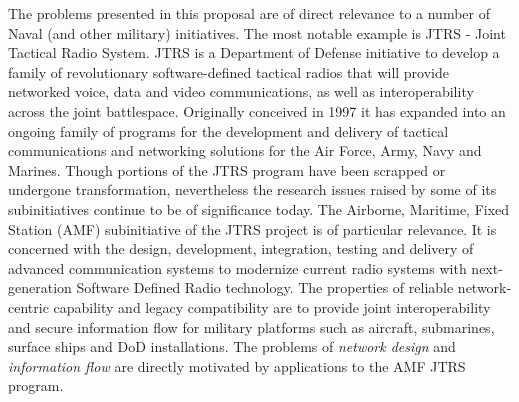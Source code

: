 The problems presented in this proposal are of direct relevance to a number of Naval (and other military) 
initiatives. The most notable example is JTRS \cite{feickert} - Joint Tactical Radio System. 
JTRS is a Department of 
Defense initiative to develop a family of revolutionary software-defined tactical radios 
that will provide networked voice, data and video communications, as well as interoperability 
across the joint battlespace. Originally conceived in 1997 it has expanded into an ongoing 
family of programs for the development and delivery of tactical communications and networking 
solutions for the Air Force, Army, Navy and Marines. Though portions of the JTRS program have
been scrapped or undergone transformation, nevertheless the research issues raised by some of 
its subinitiatives continue to be of significance today.
The Airborne, Maritime, Fixed Station (AMF) subinitiative of the JTRS project is of particular 
relevance.  It is concerned with the design, development, integration, testing and delivery of
advanced communication systems to modernize current radio systems with next-generation 
Software Defined Radio technology. The properties of reliable network-centric capability and legacy 
compatibility are to provide joint interoperability and secure information flow for 
military platforms such as aircraft, submarines, surface ships and DoD installations.
The problems of {\em network design} and {\em information flow} are directly motivated by
applications to the AMF JTRS program.

